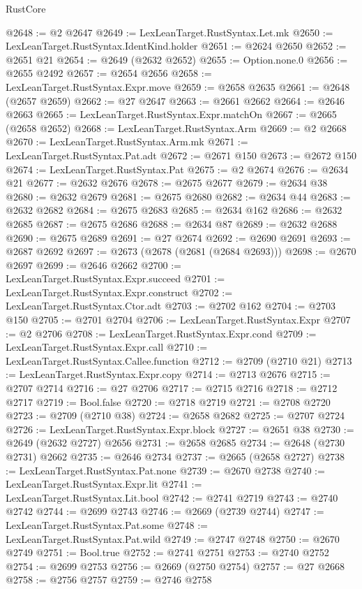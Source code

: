 \begin{lexlean}{RustCore}
\begin{coremodule}
@2648 := @2 @2647
@2649 := LexLeanTarget.RustSyntax.Let.mk
@2650 := LexLeanTarget.RustSyntax.IdentKind.holder
@2651 := @2624 @2650
@2652 := @2651 @21
@2654 := @2649 (@2632 @2652)
@2655 := Option.none.{0}
@2656 := @2655 @2492
@2657 := @2654 @2656
@2658 := LexLeanTarget.RustSyntax.Expr.move
@2659 := @2658 @2635
@2661 := @2648 (@2657 @2659)
@2662 := @27 @2647
@2663 := @2661 @2662
@2664 := @2646 @2663
@2665 := LexLeanTarget.RustSyntax.Expr.matchOn
@2667 := @2665 (@2658 @2652)
@2668 := LexLeanTarget.RustSyntax.Arm
@2669 := @2 @2668
@2670 := LexLeanTarget.RustSyntax.Arm.mk
@2671 := LexLeanTarget.RustSyntax.Pat.adt
@2672 := @2671 @150
@2673 := @2672 @150
@2674 := LexLeanTarget.RustSyntax.Pat
@2675 := @2 @2674
@2676 := @2634 @21
@2677 := @2632 @2676
@2678 := @2675 @2677
@2679 := @2634 @38
@2680 := @2632 @2679
@2681 := @2675 @2680
@2682 := @2634 @44
@2683 := @2632 @2682
@2684 := @2675 @2683
@2685 := @2634 @162
@2686 := @2632 @2685
@2687 := @2675 @2686
@2688 := @2634 @87
@2689 := @2632 @2688
@2690 := @2675 @2689
@2691 := @27 @2674
@2692 := @2690 @2691
@2693 := @2687 @2692
@2697 := @2673 (@2678 (@2681 (@2684 @2693)))
@2698 := @2670 @2697
@2699 := @2646 @2662
@2700 := LexLeanTarget.RustSyntax.Expr.succeed
@2701 := LexLeanTarget.RustSyntax.Expr.construct
@2702 := LexLeanTarget.RustSyntax.Ctor.adt
@2703 := @2702 @162
@2704 := @2703 @150
@2705 := @2701 @2704
@2706 := LexLeanTarget.RustSyntax.Expr
@2707 := @2 @2706
@2708 := LexLeanTarget.RustSyntax.Expr.cond
@2709 := LexLeanTarget.RustSyntax.Expr.call
@2710 := LexLeanTarget.RustSyntax.Callee.function
@2712 := @2709 (@2710 @21)
@2713 := LexLeanTarget.RustSyntax.Expr.copy
@2714 := @2713 @2676
@2715 := @2707 @2714
@2716 := @27 @2706
@2717 := @2715 @2716
@2718 := @2712 @2717
@2719 := Bool.false
@2720 := @2718 @2719
@2721 := @2708 @2720
@2723 := @2709 (@2710 @38)
@2724 := @2658 @2682
@2725 := @2707 @2724
@2726 := LexLeanTarget.RustSyntax.Expr.block
@2727 := @2651 @38
@2730 := @2649 (@2632 @2727) @2656
@2731 := @2658 @2685
@2734 := @2648 (@2730 @2731) @2662
@2735 := @2646 @2734
@2737 := @2665 (@2658 @2727)
@2738 := LexLeanTarget.RustSyntax.Pat.none
@2739 := @2670 @2738
@2740 := LexLeanTarget.RustSyntax.Expr.lit
@2741 := LexLeanTarget.RustSyntax.Lit.bool
@2742 := @2741 @2719
@2743 := @2740 @2742
@2744 := @2699 @2743
@2746 := @2669 (@2739 @2744)
@2747 := LexLeanTarget.RustSyntax.Pat.some
@2748 := LexLeanTarget.RustSyntax.Pat.wild
@2749 := @2747 @2748
@2750 := @2670 @2749
@2751 := Bool.true
@2752 := @2741 @2751
@2753 := @2740 @2752
@2754 := @2699 @2753
@2756 := @2669 (@2750 @2754)
@2757 := @27 @2668
@2758 := @2756 @2757
@2759 := @2746 @2758

\end{coremodule}
\end{lexlean}
